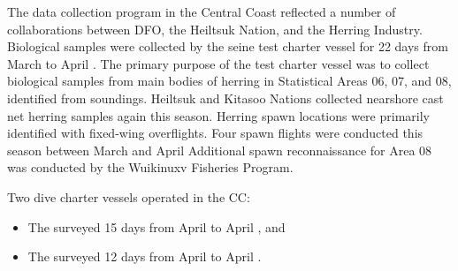 The data collection program in the Central Coast reflected
a number of collaborations between
DFO, the Heiltsuk Nation, and the Herring Industry.
Biological samples were collected by the seine test charter vessel
 for 22 days from March  to April .
The primary purpose of the test charter vessel was to
collect biological samples from main bodies of herring
in Statistical Areas 06, 07, and 08, identified from soundings.
Heiltsuk and Kitasoo Nations collected nearshore
cast net herring samples again this season.
Herring spawn locations were primarily identified with fixed-wing overflights.
Four spawn flights were conducted this season between
March  and April 
Additional spawn reconnaissance for Area 08 was conducted
by the Wuikinuxv Fisheries Program.

Two dive charter vessels operated in the CC:

\begin{itemize}

\item The  surveyed 15 days from April  to April , and

\item The  surveyed 12 days from April  to April .

\end{itemize}
